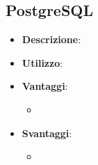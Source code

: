 \subsection{PostgreSQL}
\begin{itemize}
	\item \textbf{Descrizione}:
	\item \textbf{Utilizzo}:
	\item \textbf{Vantaggi}:
	\begin{itemize}
		\item 
	\end{itemize}
	\item \textbf{Svantaggi}:
	\begin{itemize}
		\item 
	\end{itemize}
\end{itemize}



